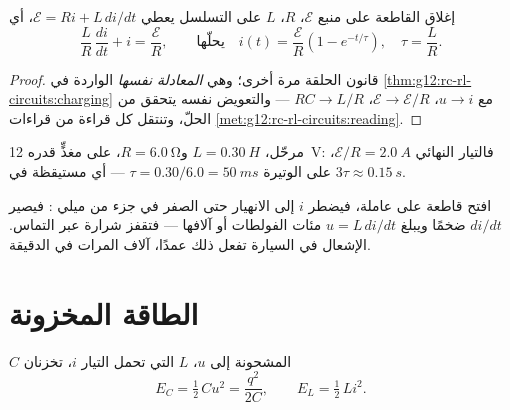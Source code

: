\begin{proposition}\label{prop:g12:rc-rl-circuits:rl}
إغلاق القاطعة على منبع $\mathcal{E}$،  $R$، 
$L$ على التسلسل يعطي $\mathcal{E} = Ri + L\,di/dt$، أي
\[
\frac{L}{R}\,\frac{di}{dt} + i = \frac{\mathcal{E}}{R},
\qquad\text{يحلّها}\quad
i(t) = \frac{\mathcal{E}}{R}\left(1 - e^{-t/\tau}\right),
\quad \tau = \frac{L}{R} .
\]
\end{proposition}

\begin{proof}
قانون الحلقة مرة أخرى؛ وهي \emph{المعادلة نفسها} الواردة في
\cref{thm:g12:rc-rl-circuits:charging} مع $u \to i$،
$\mathcal{E} \to \mathcal{E}/R$، $RC \to L/R$ --- والتعويض نفسه
يتحقق من الحلّ، وتنتقل كل قراءة من قراءات
\cref{met:g12:rc-rl-circuits:reading}.
\end{proof}

\begin{example}\label{ex:g12:rc-rl-circuits:rl}
 مرحّل، $L = \qty{0.30}{H}$ و$R = \qty{6.0}{\ohm}$، على
مغذٍّ قدره \qty{12}{V}: فالتيار النهائي $\mathcal{E}/R = \qty{2.0}{A}$، على
الوتيرة $\tau = 0.30/6.0 = \qty{50}{ms}$ --- أي مستيقظة في $3\tau \approx
\qty{0.15}{s}$.
\end{example}

\begin{remark}\label{rem:g12:rc-rl-circuits:spark}
افتح قاطعة على  عاملة، فيضطر $i$ إلى الانهيار حتى الصفر في جزء
من ميلي : فيصير $di/dt$ ضخمًا ويبلغ $u = L\,di/dt$ مئات
الفولطات أو آلافها --- فتقفز شرارة عبر التماس.  الإشعال في السيارة
تفعل ذلك عمدًا، آلاف المرات في الدقيقة.
\end{remark}

\section{الطاقة المخزونة}

\begin{proposition}\label{prop:g12:rc-rl-circuits:energy}
 $C$ المشحونة إلى  $u$،  $L$ التي تحمل التيار
$i$، تخزنان
\[
E_C = \tfrac12\,C u^2 = \frac{q^2}{2C},
\qquad
E_L = \tfrac12\,L i^2 .
\]
\end{proposition}

